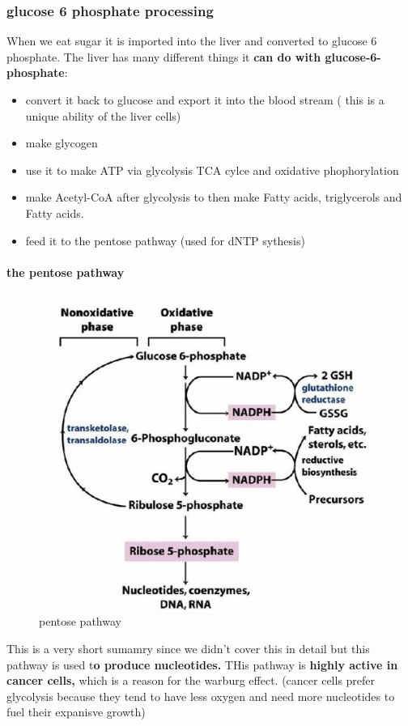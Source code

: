 \documentclass[../main.tex]{subfiles}
\begin{document}
\subsubsection{glucose 6 phosphate processing}
When we eat sugar it is imported into the liver and converted to glucose 6 phosphate. The liver has many different things it \textbf{can do with glucose-6-phosphate}:
\begin{itemize}
    \item convert it back to glucose and export it into the blood stream ( this is a unique ability of the liver cells)
    \item make glycogen
    \item use it to make ATP via glycolysis TCA cylce and oxidative phophorylation
    \item make Acetyl-CoA after glycolysis to then make Fatty acids, triglycerols and Fatty acids.
    \item feed it to the pentose pathway (used for dNTP sythesis)
\end{itemize}
\paragraph{the pentose pathway}
\begin{figure}[H]
    \centering
    \includegraphics[width=0.5\linewidth]{PPP.png}
    \caption{pentose pathway}
    \label{fig:enter-label}
\end{figure}
This is a very short sumamry since we didn't cover this in detail but this pathway is used t\textbf{o produce nucleotides.} THis pathway is\textbf{ highly active in cancer cells,} which is a reason for the warburg effect. (cancer cells prefer glycolysis because they tend to have less oxygen and need more nucleotides to fuel their expanisve growth)
\end{document}
